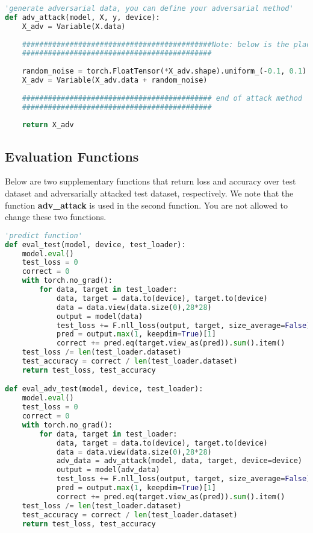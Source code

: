\begin{lstlisting}[language=Python]
'generate adversarial data, you can define your adversarial method'
def adv_attack(model, X, y, device):
    X_adv = Variable(X.data)
    
    ############################################Note: below is the place you need to edit to implement your own attack algorithm
    ############################################
    
    random_noise = torch.FloatTensor(*X_adv.shape).uniform_(-0.1, 0.1).to(device)
    X_adv = Variable(X_adv.data + random_noise)
    
    ############################################ end of attack method
    ############################################
    
    return X_adv
\end{lstlisting}


\subsection*{Evaluation Functions}

Below are two supplementary functions that return loss and accuracy over test dataset and adversarially attacked test dataset, respectively. We note that the function \textbf{adv\_attack} is used in the second function. You are not allowed to change these two functions. 

\begin{lstlisting}[language=Python]
'predict function'
def eval_test(model, device, test_loader):
    model.eval()
    test_loss = 0
    correct = 0
    with torch.no_grad():
        for data, target in test_loader:
            data, target = data.to(device), target.to(device)
            data = data.view(data.size(0),28*28)
            output = model(data)
            test_loss += F.nll_loss(output, target, size_average=False).item()
            pred = output.max(1, keepdim=True)[1]
            correct += pred.eq(target.view_as(pred)).sum().item()
    test_loss /= len(test_loader.dataset)
    test_accuracy = correct / len(test_loader.dataset)
    return test_loss, test_accuracy

def eval_adv_test(model, device, test_loader):
    model.eval()
    test_loss = 0
    correct = 0
    with torch.no_grad():
        for data, target in test_loader:
            data, target = data.to(device), target.to(device)
            data = data.view(data.size(0),28*28)
            adv_data = adv_attack(model, data, target, device=device)
            output = model(adv_data)
            test_loss += F.nll_loss(output, target, size_average=False).item()
            pred = output.max(1, keepdim=True)[1]
            correct += pred.eq(target.view_as(pred)).sum().item()
    test_loss /= len(test_loader.dataset)
    test_accuracy = correct / len(test_loader.dataset)
    return test_loss, test_accuracy
\end{lstlisting}


